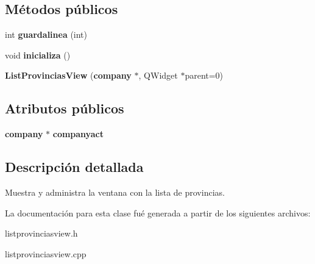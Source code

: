 \subsection*{M\'{e}todos p\'{u}blicos}
\begin{CompactItemize}
\item 
int {\bf guardalinea} (int)\label{classListProvinciasView_a0}

\item 
void {\bf inicializa} ()\label{classListProvinciasView_a1}

\item 
{\bf List\-Provincias\-View} ({\bf company} $\ast$, QWidget $\ast$parent=0)\label{classListProvinciasView_a2}

\end{CompactItemize}
\subsection*{Atributos p\'{u}blicos}
\begin{CompactItemize}
\item 
{\bf company} $\ast$ {\bf companyact}\label{classListProvinciasView_o0}

\end{CompactItemize}


\subsection{Descripci\'{o}n detallada}
Muestra y administra la ventana con la lista de provincias. 



La documentaci\'{o}n para esta clase fu\'{e} generada a partir de los siguientes archivos:\begin{CompactItemize}
\item 
listprovinciasview.h\item 
listprovinciasview.cpp\end{CompactItemize}
